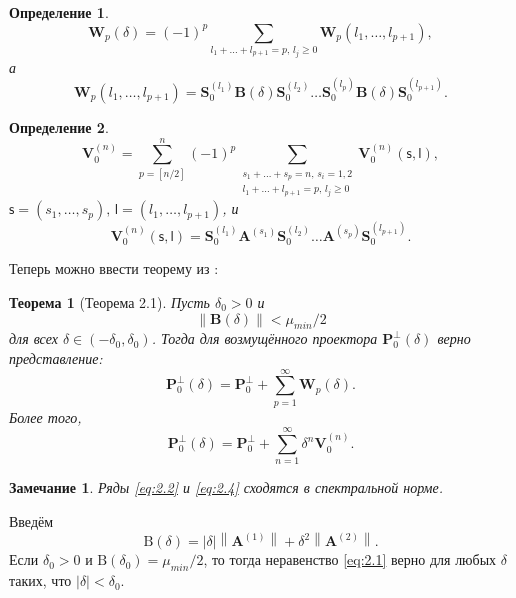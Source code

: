 \documentclass[specialist,
               substylefile = spbu_report.rtx,
               subf,href,colorlinks=true, 12pt]{disser}
\newcommand\norm[1]{\left\|#1\right\|}
\newtheorem{theorem}{Теорема}
\newtheorem{remark}{Замечание}
\newtheorem{definition}{Определение}
\begin{document}
\begin{definition}
\begin{equation}
	\mathbf{W}_p(\delta) = (-1)^p\sum\limits_{l_1+\dots+l_{p+1}=p,\,l_j\geqslant0}\mathbf{W}_p(l_1,\dots,l_{p+1}),\label{eq:w}
\end{equation}
а
\begin{equation*}
	\mathbf{W}_p(l_1,\dots,l_{p+1}) = \mathbf{S}_0^{(l_1)}\mathbf{B}(\delta)\mathbf{S}_0^{(l_2)}\dots\mathbf{S}_0^{(l_p)}\mathbf{B}(\delta)\mathbf{S}_0^{(l_{p+1})}.
\end{equation*}
\end{definition}
\begin{definition}
	\begin{equation*}
	\mathbf{V}_0^{(n)}=\sum\limits_{p=[n/2]}^n(-1)^p\sum_{\substack{
			s_1+\dots+s_p=n,\,s_i=1,2\\
			l_1+\dots+l_{p+1}=p,\,l_j\geqslant0}}
	\mathbf{V}_0^{(n)}(\mathsf{s},\mathsf{l}),
\end{equation*}
$\mathsf{s} = (s_1,\dots,s_p),\,\mathsf{l}=(l_1,\dots,l_{p+1})$, и
\begin{equation*}
	\mathbf{V}_0^{(n)}(\mathsf{s}, \mathsf{l})=\mathbf{S}_0^{(l_1)}\mathbf{A}^{(s_1)}\mathbf{S}_0^{(l_2)}\dots\mathbf{A}^{(s_p)}\mathbf{S}_0^{(l_{p+1})}.
\end{equation*}
\end{definition}
Теперь можно ввести теорему из \cite{Nekrutkin10}:
\begin{theorem}[Теорема 2.1]\label{th:2.1}\rm
	\emph{Пусть} $\delta_0>0$ и
	\begin{equation}\label{eq:2.1}
		\norm{\mathbf{B}(\delta)}<\mu_{min}/2
	\end{equation}
	\emph{для всех} $\delta\in(-\delta_0,\delta_0)$. \emph{Тогда для возмущённого проектора} $\mathbf{P}_0^\bot(\delta)$ \emph{верно представление:}
	\begin{equation}\label{eq:2.2}
		\mathbf{P}_0^\bot(\delta)=\mathbf{P}_0^\bot + \sum_{p=1}^\infty\mathbf{W}_p(\delta).
	\end{equation}
	\emph{Более того,}
	\begin{equation}\label{eq:2.4}
		\mathbf{P}_0^\bot(\delta) = \mathbf{P}_0^\bot + \sum_{n=1}^\infty\delta^n\mathbf{V}_0^{(n)}.
	\end{equation}
\end{theorem}
\begin{remark}
Ряды	\eqref{eq:2.2} и \eqref{eq:2.4} сходятся в спектральной норме.
\end{remark}
Введём
\begin{equation*}
	\mathrm{B}(\delta) = |\delta|\norm{\mathbf{A}^{(1)}}+\delta^2\norm{\mathbf{A}^{(2)}}.
\end{equation*}
Если $\delta_0>0$ и $\mathrm{B}(\delta_0)=\mu_{min}/2$, то тогда неравенство \eqref{eq:2.1} верно для любых $\delta$ таких, что $|\delta|<\delta_0$.
\end{document}
